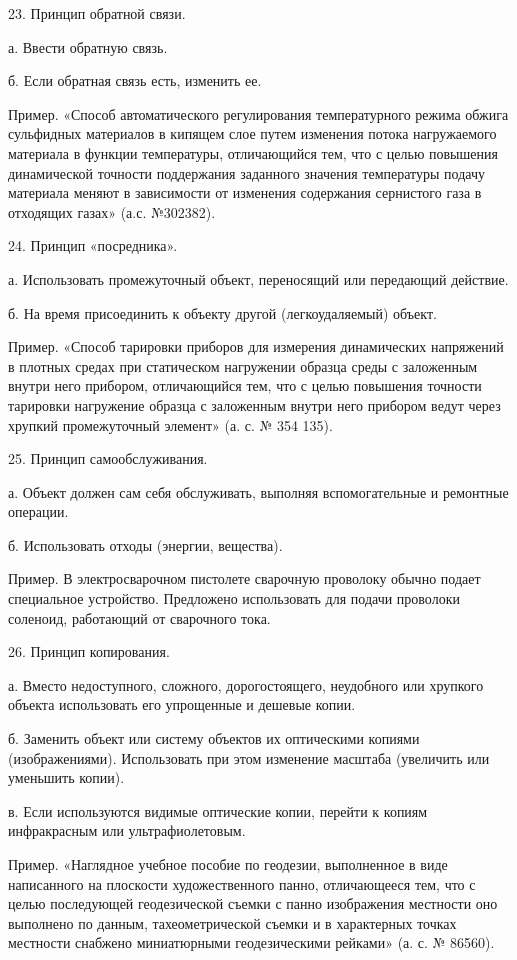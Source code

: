 23. Принцип обратной связи.

а. Ввести обратную связь.

б. Если обратная связь есть, изменить ее.

Пример.  «Способ автоматического  регулирования температурного  режима
обжига  сульфидных материалов  в кипящем  слое путем  изменения потока
нагружаемого материала в функции  температуры, отличающийся тем, что с
целью повышения  динамической точности поддержания  заданного значения
температуры  подачу  материала  меняют   в  зависимости  от  изменения
содержания сернистого газа в отходящих газах» (а.с. №302382).

24. Принцип «посредника».

а.  Использовать  промежуточный  объект,  переносящий  или  передающий
действие.

б. На время присоединить к объекту другой (легкоудаляемый) объект.

Пример.   «Способ  тарировки   приборов  для   измерения  динамических
напряжений в плотных средах при статическом нагружении образца среды с
заложенным  внутри  него  прибором,  отличающийся  тем,  что  с  целью
повышения точности  тарировки нагружение  образца с  заложенным внутри
него прибором ведут через хрупкий  промежуточный элемент» (а. с. № 354
135).

25. Принцип самообслуживания.

а.  Объект должен  сам  себя обслуживать,  выполняя вспомогательные  и
ремонтные операции.

б. Использовать отходы (энергии, вещества).

Пример. В электросварочном пистолете сварочную проволоку обычно подает
специальное устройство.  Предложено использовать для  подачи проволоки
соленоид, работающий от сварочного тока.

26. Принцип копирования.

а.  Вместо  недоступного,  сложного,  дорогостоящего,  неудобного  или
хрупкого объекта использовать его упрощенные и дешевые копии.

б.  Заменить  объект  или  систему  объектов  их  оптическими  копиями
(изображениями). Использовать  при этом изменение  масштаба (увеличить
или уменьшить копии).

в.  Если  используются  видимые  оптические копии,  перейти  к  копиям
инфракрасным или ультрафиолетовым.

Пример.  «Наглядное учебное  пособие по  геодезии, выполненное  в виде
написанного на плоскости художественного  панно, отличающееся тем, что
с целью последующей геодезической съемки с панно изображения местности
оно  выполнено  по данным,  тахеометрической  съемки  и в  характерных
точках местности снабжено миниатюрными  геодезическими рейками» (а. с.
№ 86560).


